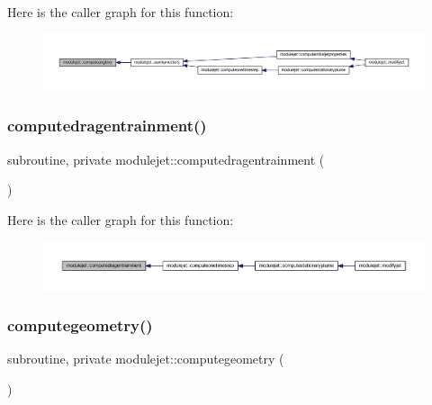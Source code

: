 Here is the caller graph for this function\+:\nopagebreak
\begin{figure}[H]
\begin{center}
\leavevmode
\includegraphics[width=350pt]{namespacemodulejet_adbbd50d3810071999488736815c23285_icgraph}
\end{center}
\end{figure}
\mbox{\label{namespacemodulejet_a8bbbce93ba8d9ba74525873c550cdf8b}} 
\subsubsection{\texorpdfstring{computedragentrainment()}{computedragentrainment()}}
{\footnotesize\ttfamily subroutine, private modulejet\+::computedragentrainment (\begin{DoxyParamCaption}{ }\end{DoxyParamCaption})\hspace{0.3cm}{\ttfamily [private]}}

Here is the caller graph for this function\+:\nopagebreak
\begin{figure}[H]
\begin{center}
\leavevmode
\includegraphics[width=350pt]{namespacemodulejet_a8bbbce93ba8d9ba74525873c550cdf8b_icgraph}
\end{center}
\end{figure}
\mbox{\label{namespacemodulejet_a0d3bcdd114f549e27a46b673224a1f35}} 
\subsubsection{\texorpdfstring{computegeometry()}{computegeometry()}}
{\footnotesize\ttfamily subroutine, private modulejet\+::computegeometry (\begin{DoxyParamCaption}{ }\end{DoxyParamCaption})\hspace{0.3cm}{\ttfamily [private]}}


